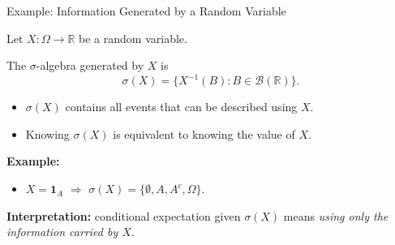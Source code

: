 \documentclass[10pt,aspectratio=169]{beamer}
\begin{document}
\begin{frame}{Example: Information Generated by a Random Variable}

Let \(X:\Omega\to\mathbb{R}\) be a random variable.
\pause
\medskip

The \(\sigma\)-algebra generated by \(X\) is
\[
\sigma(X)
=
\{X^{-1}(B): B\in\mathcal{B}(\mathbb{R})\}.
\]\pause

\medskip

\begin{itemize}
  \item \(\sigma(X)\) contains all events that can be described using \(X\).\pause
  \item Knowing \(\sigma(X)\) is equivalent to knowing the value of \(X\).\pause
\end{itemize}

\medskip
\textbf{Example:}\pause
\begin{itemize}
  \item \(X=\mathbf{1}_A\)  \(\Rightarrow\)
  \(\sigma(X)=\{\emptyset,A,A^c,\Omega\}\).\pause
\end{itemize}

\medskip
\textbf{Interpretation:}\pause
conditional expectation given \(\sigma(X)\) means
\emph{using only the information carried by \(X\)}.

\end{frame}

\end{document}
